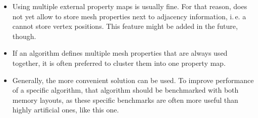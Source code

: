 \begin{itemize}
  \item Using multiple external property maps is usually fine.
  For that reason,  does not yet allow to store mesh properties next to adjacency information, i.\,e. a  cannot store vertex positions.
  This feature might be added in the future, though.
  \item If an algorithm defines multiple mesh properties that are always used together, it is often preferred to cluster them into one property map.
  \item Generally, the more convenient solution can be used.
  To improve performance of a specific algorithm, that algorithm should be benchmarked with both memory layouts, as these specific benchmarks are often more useful than highly artificial ones, like this one.
\end{itemize}
